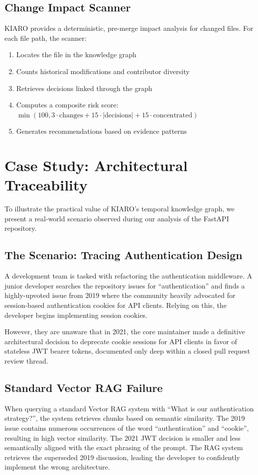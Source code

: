 \documentclass[conference]{IEEEtran}
\begin{document}
\subsection{Change Impact Scanner}
KIARO provides a deterministic, pre-merge impact analysis for changed files. For each file path, the scanner:
\begin{enumerate}
    \item Locates the file in the knowledge graph
    \item Counts historical modifications and contributor diversity
    \item Retrieves decisions linked through the graph
    \item Computes a composite risk score: $\min(100, 3 \cdot \text{changes} + 15 \cdot |\text{decisions}| + 15 \cdot \text{concentrated})$
    \item Generates recommendations based on evidence patterns
\end{enumerate}

\section{Case Study: Architectural Traceability}
\label{sec:casestudy}

To illustrate the practical value of KIARO's temporal knowledge graph, we present a real-world scenario observed during our analysis of the FastAPI repository.

\subsection{The Scenario: Tracing Authentication Design}
A development team is tasked with refactoring the authentication middleware. A junior developer searches the repository issues for ``authentication'' and finds a highly-upvoted issue from 2019 where the community heavily advocated for session-based authentication cookies for API clients. Relying on this, the developer begins implementing session cookies. 

However, they are unaware that in 2021, the core maintainer made a definitive architectural decision to deprecate cookie sessions for API clients in favor of stateless JWT bearer tokens, documented only deep within a closed pull request review thread.

\subsection{Standard Vector RAG Failure}
When querying a standard Vector RAG system with ``What is our authentication strategy?'', the system retrieves chunks based on semantic similarity. The 2019 issue contains numerous occurrences of the word ``authentication'' and ``cookie'', resulting in high vector similarity. The 2021 JWT decision is smaller and less semantically aligned with the exact phrasing of the prompt. The RAG system retrieves the superseded 2019 discussion, leading the developer to confidently implement the wrong architecture.
\end{document}
